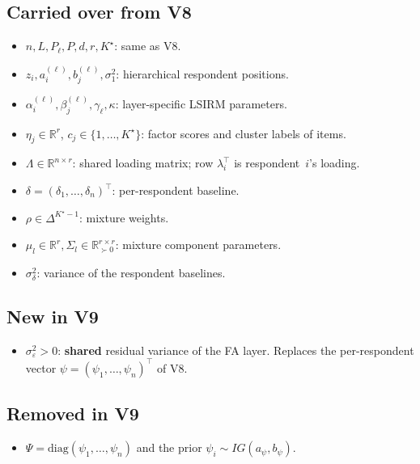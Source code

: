 \documentclass[11pt]{article}
\begin{document}
\subsection*{Carried over from V8}

\begin{itemize}[leftmargin=1.5em]
    \item $n,L,P_\ell,P,d,r,K^\star$: same as V8.
    \item $z_i,a_i^{(\ell)},b_j^{(\ell)},\sigma_1^2$: hierarchical respondent positions.
    \item $\alpha_i^{(\ell)},\beta_j^{(\ell)},\gamma_\ell,\kappa$: layer-specific LSIRM parameters.
    \item $\eta_j\in\mathbb{R}^r$, $c_j\in\{1,\dots,K^\star\}$: factor scores and cluster labels of items.
    \item $\Lambda\in\mathbb{R}^{n\times r}$: shared loading matrix; row $\lambda_i^\top$ is respondent~$i$'s loading.
    \item $\delta=(\delta_1,\dots,\delta_n)^\top$: per-respondent baseline.
    \item $\rho\in\Delta^{K^\star-1}$: mixture weights.
    \item $\mu_l\in\mathbb{R}^r,\Sigma_l\in\mathbb{R}^{r\times r}_{\succ 0}$: mixture component parameters.
    \item $\sigma_\delta^2$: variance of the respondent baselines.
\end{itemize}

\subsection*{New in V9}

\begin{itemize}[leftmargin=1.5em]
    \item $\sigma_\varepsilon^2 > 0$: \textbf{shared} residual variance of the FA layer.
        Replaces the per-respondent vector $\psi=(\psi_1,\dots,\psi_n)^\top$ of V8.
\end{itemize}

\subsection*{Removed in V9}

\begin{itemize}[leftmargin=1.5em]
    \item $\Psi=\mathrm{diag}(\psi_1,\dots,\psi_n)$ and the prior $\psi_i\sim IG(a_\psi,b_\psi)$.
\end{itemize}
\end{document}
